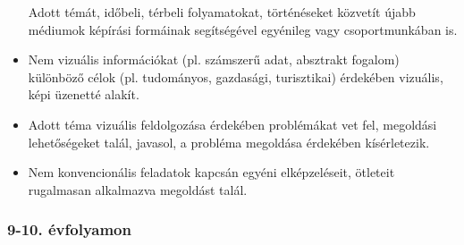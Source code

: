 \begin{itemize}
  Adott témát, időbeli, térbeli folyamatokat, történéseket közvetít
  újabb médiumok képírási formáinak segítségével egyénileg vagy
  csoportmunkában is.
\item
  Nem vizuális információkat (pl. számszerű adat, absztrakt fogalom)
  különböző célok (pl. tudományos, gazdasági, turisztikai) érdekében
  vizuális, képi üzenetté alakít.
\item
  Adott téma vizuális feldolgozása érdekében problémákat vet fel,
  megoldási lehetőségeket talál, javasol, a probléma megoldása érdekében
  kísérletezik.
\item
  Nem konvencionális feladatok kapcsán egyéni elképzeléseit, ötleteit
  rugalmasan alkalmazva megoldást talál.
\end{itemize}

\hypertarget{evfolyamon-40}{%
\subsubsection{9-10. évfolyamon}\label{evfolyamon-40}}

